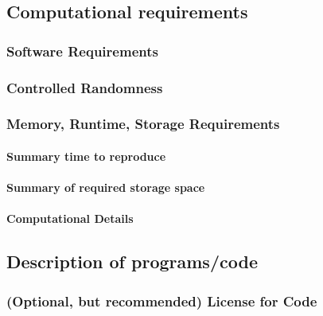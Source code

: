 \documentclass[
]{article}
\begin{document}
\hypertarget{computational-requirements}{%
\subsection{Computational
requirements}\label{computational-requirements}}

\hypertarget{software-requirements}{%
\subsubsection{Software Requirements}\label{software-requirements}}

\hypertarget{controlled-randomness}{%
\subsubsection{Controlled Randomness}\label{controlled-randomness}}

\hypertarget{memory-runtime-storage-requirements}{%
\subsubsection{Memory, Runtime, Storage
Requirements}\label{memory-runtime-storage-requirements}}

\hypertarget{summary-time-to-reproduce}{%
\paragraph{Summary time to reproduce}\label{summary-time-to-reproduce}}

\hypertarget{summary-of-required-storage-space}{%
\paragraph{Summary of required storage
space}\label{summary-of-required-storage-space}}

\hypertarget{computational-details}{%
\paragraph{Computational Details}\label{computational-details}}

\hypertarget{description-of-programscode}{%
\subsection{Description of
programs/code}\label{description-of-programscode}}

\hypertarget{optional-but-recommended-license-for-code}{%
\subsubsection{(Optional, but recommended) License for
Code}\label{optional-but-recommended-license-for-code}}
\end{document}
